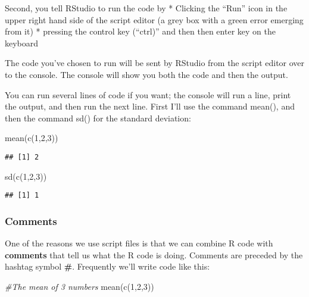 \documentclass[
]{book}
\newenvironment{Shaded}{\begin{snugshade}}{\end{snugshade}}
\newcommand{\CommentTok}[1]{\textcolor[rgb]{0.56,0.35,0.01}{\textit{#1}}}
\newcommand{\DecValTok}[1]{\textcolor[rgb]{0.00,0.00,0.81}{#1}}
\newcommand{\FunctionTok}[1]{\textcolor[rgb]{0.00,0.00,0.00}{#1}}
\newcommand{\NormalTok}[1]{#1}
\begin{document}
Second, you tell RStudio to run the code by
* Clicking the ``Run'' icon in the upper right hand side of the script editor (a grey box with a green error emerging from it)
* pressing the control key (``ctrl)'' and then then enter key on the keyboard

The code you've chosen to run will be sent by RStudio from the script editor over to the console. The console will show you both the code and then the output.

You can run several lines of code if you want; the console will run a line, print the output, and then run the next line. First I'll use the command mean(), and then the command sd() for the standard deviation:

\begin{Shaded}
\begin{Highlighting}[]
\FunctionTok{mean}\NormalTok{(}\FunctionTok{c}\NormalTok{(}\DecValTok{1}\NormalTok{,}\DecValTok{2}\NormalTok{,}\DecValTok{3}\NormalTok{))}
\end{Highlighting}
\end{Shaded}

\begin{verbatim}
## [1] 2
\end{verbatim}

\begin{Shaded}
\begin{Highlighting}[]
\FunctionTok{sd}\NormalTok{(}\FunctionTok{c}\NormalTok{(}\DecValTok{1}\NormalTok{,}\DecValTok{2}\NormalTok{,}\DecValTok{3}\NormalTok{))}
\end{Highlighting}
\end{Shaded}

\begin{verbatim}
## [1] 1
\end{verbatim}

\hypertarget{comments}{%
\subsubsection{Comments}\label{comments}}

One of the reasons we use script files is that we can combine R code with \textbf{comments} that tell us what the R code is doing. Comments are preceded by the hashtag symbol \textbf{\#}. Frequently we'll write code like this:

\begin{Shaded}
\begin{Highlighting}[]
\CommentTok{\#The mean of 3 numbers}
\FunctionTok{mean}\NormalTok{(}\FunctionTok{c}\NormalTok{(}\DecValTok{1}\NormalTok{,}\DecValTok{2}\NormalTok{,}\DecValTok{3}\NormalTok{))}
\end{Highlighting}
\end{Shaded}
\end{document}
